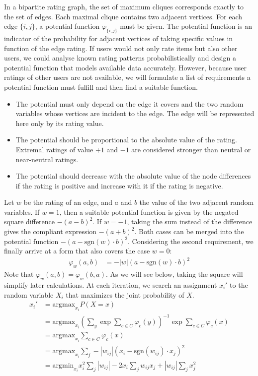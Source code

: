 \documentclass[11pt,a4paper]{book}
\begin{document}
In a bipartite rating graph, the set of maximum cliques corresponds exactly to
the set of edges.  Each maximal clique contains two adjacent vertices.
For each edge $\{i,j\}$, a potential function $\varphi_{\{i,j\}}$ must
be given.  The potential function is an 
indicator of the probability for adjacent vertices of taking specific values in
function of the edge rating.  If users would not only rate items but also other
users, we could analyse known rating patterns probabilistically and design a
potential function that models available data accurately.
However, because user ratings of other users are not available,
we will formulate a list of requirements a potential function must
fulfill and then find a suitable function.  
\begin{itemize}
\item The potential must only depend on the edge it covers and the two
  random variables whose vertices are incident to the edge.  The edge will be
  represented here only by its rating value.  
\item The potential should be proportional to the absolute value of the rating.
  Extremal ratings of value $+1$ and $-1$ are considered stronger than
  neutral or near-neutral ratings. 
\item The potential should decrease with the absolute value of the node
  differences if the rating is positive and increase with it if the rating
  is negative. 
\end{itemize}
Let $w$ be the rating of an edge, and $a$ and $b$ the value of the two adjacent
random variables.  
If $w=1$, then a suitable potential function is given by the negated
square difference 
$-(a-b)^2$.  If $w=-1$, taking the sum instead of the difference gives the
compliant expression  $-(a+b)^2$.  Both cases can be merged into the potential
function $-\left(a- \mathrm{sgn}(w) \cdot b\right)^2$.  Considering the second
requirement, we finally arrive at a form that also covers the case $w=0$:
\begin{align}
  \varphi_w (a, b) &= -|w| \left(a - \mathrm{sgn}(w) \cdot b\right)^2 
\end{align}
Note that $\varphi_w(a, b) = \varphi_w (b, a)$.
As we will see below, taking the square will simplify 
later calculations.  
At each iteration, we search an assignment $x_i'$ to the random variable $X_i$
that maximizes the joint probability of $X$.   
\begin{align*}
  x_i'&= \mathrm{argmax}_{x_i} P(X = x)  \\
  &= \mathrm{argmax}_{x_i} \left( \sum_y \exp \sum_{c\in C}
  \varphi_c(y)\right)^{-1} \exp \sum_{c\in C} \varphi_c(x)  \\ 
  &= \mathrm{argmax}_{x_i} \sum_{c \in C} \varphi_c(x)  \\
  &= \mathrm{argmax}_{x_i} \sum_{j} -|w_{ij}| (x_i - 
  \mathrm{sgn}(w_{ij}) \cdot x_j )^2  \\
  &= \mathrm{argmin}_{x_i} x_i^2 \sum_j |w_{ij}| - 2 x_i \sum_j w_{ij}
  x_j + |w_{ij}|\sum_j x_j^2  
\end{align*}
\end{document}
